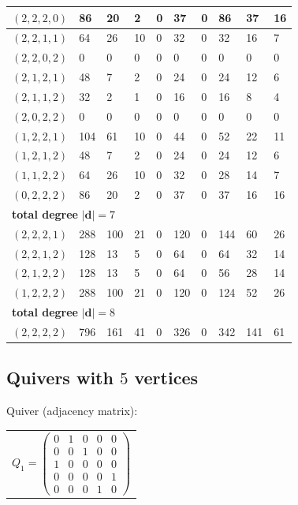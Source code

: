 \documentclass{article}
\newcommand{\bd}{\mathbf{d}}
\begin{document}
\begin{longtable}{|l|l|l|l|l|l|l|l|l|l|}
$(2,2,2,0)$ & 86 & 20 & 2 & 0 & 37 & 0 & 86 & 37 & 16 \\ \hline
$(2,2,1,1)$ & 64 & 26 & 10 & 0 & 32 & 0 & 32 & 16 & 7 \\ \hline
$(2,2,0,2)$ & 0 & 0 & 0 & 0 & 0 & 0 & 0 & 0 & 0 \\ \hline
$(2,1,2,1)$ & 48 & 7 & 2 & 0 & 24 & 0 & 24 & 12 & 6 \\ \hline
$(2,1,1,2)$ & 32 & 2 & 1 & 0 & 16 & 0 & 16 & 8 & 4 \\ \hline
$(2,0,2,2)$ & 0 & 0 & 0 & 0 & 0 & 0 & 0 & 0 & 0 \\ \hline
$(1,2,2,1)$ & 104 & 61 & 10 & 0 & 44 & 0 & 52 & 22 & 11 \\ \hline
$(1,2,1,2)$ & 48 & 7 & 2 & 0 & 24 & 0 & 24 & 12 & 6 \\ \hline
$(1,1,2,2)$ & 64 & 26 & 10 & 0 & 32 & 0 & 28 & 14 & 7 \\ \hline
$(0,2,2,2)$ & 86 & 20 & 2 & 0 & 37 & 0 & 37 & 16 & 16 \\ \hline
\multicolumn{10}{|l|}{\textbf{total degree }$|\bd|=7$} \\ \hline
$(2,2,2,1)$ & 288 & 100 & 21 & 0 & 120 & 0 & 144 & 60 & 26 \\ \hline
$(2,2,1,2)$ & 128 & 13 & 5 & 0 & 64 & 0 & 64 & 32 & 14 \\ \hline
$(2,1,2,2)$ & 128 & 13 & 5 & 0 & 64 & 0 & 56 & 28 & 14 \\ \hline
$(1,2,2,2)$ & 288 & 100 & 21 & 0 & 120 & 0 & 124 & 52 & 26 \\ \hline
\multicolumn{10}{|l|}{\textbf{total degree }$|\bd|=8$} \\ \hline
$(2,2,2,2)$ & 796 & 161 & 41 & 0 & 326 & 0 & 342 & 141 & 61 \\ \hline
\end{longtable}
\normalsize

\subsection*{Quivers with $5$ vertices}

\noindent Quiver (adjacency matrix):\\[4pt]
\renewcommand{\arraystretch}{1.5}
\begin{tabular}{l}
$Q_{1}=\left(\begin{smallmatrix}0&1&0&0&0\\0&0&1&0&0\\1&0&0&0&0\\0&0&0&0&1\\0&0&0&1&0\end{smallmatrix}\right)$ \\[6pt]
\end{tabular}
\renewcommand{\arraystretch}{1.0}
\end{document}

